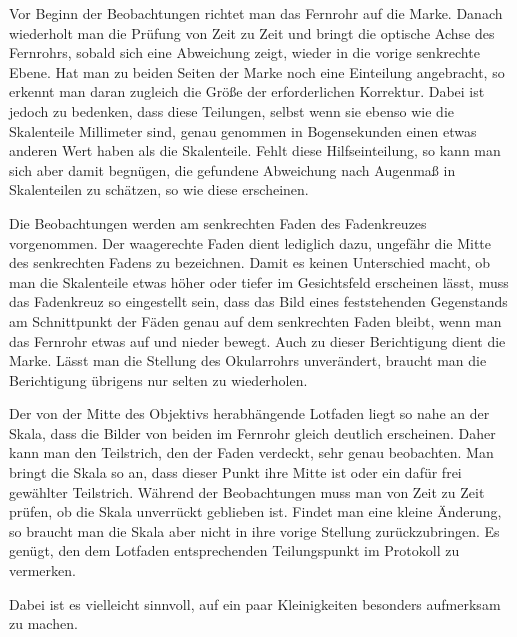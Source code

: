 Vor Beginn der Beobachtungen richtet man das Fernrohr auf die Marke. Danach wiederholt man die Prüfung von Zeit zu Zeit und bringt die optische Achse des Fernrohrs, sobald sich eine Abweichung zeigt, wieder in die vorige senkrechte Ebene. Hat man zu beiden Seiten der Marke noch eine Einteilung angebracht, so erkennt man daran zugleich die Größe der erforderlichen Korrektur. Dabei ist jedoch zu bedenken, dass diese Teilungen, selbst wenn sie ebenso wie die Skalenteile Millimeter sind, genau genommen in Bogensekunden einen etwas anderen Wert haben als die Skalenteile. Fehlt diese Hilfseinteilung, so kann man sich aber damit begnügen, die gefundene Abweichung nach Augenmaß in Skalenteilen zu schätzen, so wie diese erscheinen.

Die Beobachtungen werden am senkrechten Faden des Fadenkreuzes vorgenommen. Der waagerechte Faden dient lediglich dazu, ungefähr die Mitte des senkrechten Fadens zu bezeichnen. Damit es keinen Unterschied macht, ob man die Skalenteile etwas höher oder tiefer im Gesichtsfeld erscheinen lässt, muss das Fadenkreuz so eingestellt sein, dass das Bild eines feststehenden Gegenstands am Schnittpunkt der Fäden genau auf dem senkrechten Faden bleibt, wenn man das Fernrohr etwas auf und nieder bewegt. Auch zu dieser Berichtigung dient die Marke. Lässt man die Stellung des Okularrohrs unverändert, braucht man die Berichtigung übrigens nur selten zu wiederholen.

Der von der Mitte des Objektivs herabhängende Lotfaden liegt so nahe an der Skala, dass die Bilder von beiden im Fernrohr gleich deutlich erscheinen. Daher kann man den Teilstrich, den der Faden verdeckt, sehr genau beobachten. Man bringt die Skala so an, dass dieser Punkt ihre Mitte ist oder ein dafür frei gewählter Teilstrich. Während der Beobachtungen muss man von Zeit zu Zeit prüfen, ob die Skala unverrückt geblieben ist. Findet man eine kleine Änderung, so braucht man die Skala aber nicht in ihre vorige Stellung zurückzubringen. Es genügt, den dem Lotfaden entsprechenden Teilungspunkt im Protokoll zu vermerken.

Dabei ist es vielleicht sinnvoll, auf ein paar Kleinigkeiten besonders aufmerksam zu machen.

